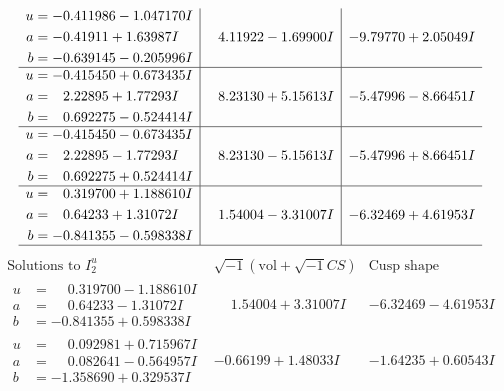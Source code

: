 \documentclass[1p]{elsarticle_modified}
\theoremstyle{definition}
\newcommand{\I}{\sqrt{-1}}
\begin{document}
$$\begin{array}{c|c|c}
\begin{aligned}
u &= -0.411986 - 1.047170 I \\
a &= -0.41911 + 1.63987 I \\
b &= -0.639145 - 0.205996 I\end{aligned}
 & \phantom{-}4.11922 - 1.69900 I & -9.79770 + 2.05049 I \\ \hline\begin{aligned}
u &= -0.415450 + 0.673435 I \\
a &= \phantom{-}2.22895 + 1.77293 I \\
b &= \phantom{-}0.692275 - 0.524414 I\end{aligned}
 & \phantom{-}8.23130 + 5.15613 I & -5.47996 - 8.66451 I \\ \hline\begin{aligned}
u &= -0.415450 - 0.673435 I \\
a &= \phantom{-}2.22895 - 1.77293 I \\
b &= \phantom{-}0.692275 + 0.524414 I\end{aligned}
 & \phantom{-}8.23130 - 5.15613 I & -5.47996 + 8.66451 I \\ \hline\begin{aligned}
u &= \phantom{-}0.319700 + 1.188610 I \\
a &= \phantom{-}0.64233 + 1.31072 I \\
b &= -0.841355 - 0.598338 I\end{aligned}
 & \phantom{-}1.54004 - 3.31007 I & -6.32469 + 4.61953 I\\
 \hline 
 \end{array}$$\newpage$$\begin{array}{c|c|c}  
\text{Solutions to }I^u_{2}& \I (\text{vol} + \sqrt{-1}CS) & \text{Cusp shape}\\
 \hline 
\begin{aligned}
u &= \phantom{-}0.319700 - 1.188610 I \\
a &= \phantom{-}0.64233 - 1.31072 I \\
b &= -0.841355 + 0.598338 I\end{aligned}
 & \phantom{-}1.54004 + 3.31007 I & -6.32469 - 4.61953 I \\ \hline\begin{aligned}
u &= \phantom{-}0.092981 + 0.715967 I \\
a &= \phantom{-}0.082641 - 0.564957 I \\
b &= -1.358690 + 0.329537 I\end{aligned}
 & -0.66199 + 1.48033 I & -1.64235 + 0.60543 I \\ \hline\begin{aligned}

\end{aligned}
\end{array}$$
\end{document}
